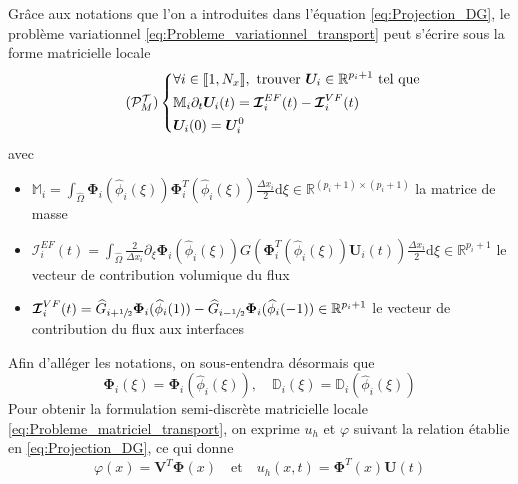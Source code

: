 \documentclass[11pt, a4paper, oneside]{report}
\begin{document}
\begin{appendices}
Grâce aux notations que l'on a introduites dans l'équation \eqref{eq:Projection_DG}, le problème variationnel \eqref{eq:Probleme_variationnel_transport} peut s'écrire sous la forme matricielle locale
\begin{equation} \tag{$\mathcal{P}_M^\mathcal{T}$} \label{eq:Probleme_matriciel_transport}
    \left \{
    \begin{aligned}
        & \forall i \in \llbracket 1, N_x \rrbracket, \text{ trouver } \bm{U}_{i} \in \mathbb{R}^{p_i + 1} \text{ tel que} \\
        &\mathbb{M}_i \partial_t \bm{U}_i(t) = \bm{\mathcal{I}}_i^{EF}(t) - \bm{\mathcal{I}}_i^{VF}(t) \\
        &\bm{U}_i(0) = \bm{U}_i^0
    \end{aligned}
    \right .
\end{equation}
avec
\begin{itemize}
    \item $\displaystyle \mathbb{M}_i = \int_{\widehat{\Omega}} \bm{\Phi}_i (\widehat{\phi}_i(\xi)) \bm{\Phi}_i^T(\widehat{\phi}_i(\xi)) \frac{\Delta x_i}{2} \text{d}\xi \in \mathbb{R}^{(p_i+1) \times (p_i+1)}$ la matrice de masse
    \item $\displaystyle \bm{\mathcal{I}}_i^{EF}(t) = \int_{\widehat{\Omega}} \frac{2}{\Delta x_i} \partial_\xi \bm{\Phi}_i(\widehat{\phi}_i(\xi)) G \left( \bm{\Phi}_i^T(\widehat{\phi}_i(\xi)) \bm{U}_i(t) \right) \frac{\Delta x_i}{2} \text{d}\xi \in \mathbb{R}^{p_i+1}$ le vecteur de contribution volumique du flux
    \item $\displaystyle \bm{\mathcal{I}}_i^{VF}(t) = \widehat{G}_{i + \sfrac{1}{2}} \bm{\Phi}_i(\widehat{\phi}_i(1)) - \widehat{G}_{i-\sfrac{1}{2}} \bm{\Phi}_i(\widehat{\phi}_i(-1)) \in \mathbb{R}^{p_i+1}$ le vecteur de contribution du flux aux interfaces
\end{itemize}
Afin d'alléger les notations, on sous-entendra désormais que
\begin{equation}
    \bm{\Phi}_i(\xi) = \bm{\Phi}_i(\widehat{\phi}_i(\xi)), \quad \mathbb{D}_i(\xi) = \mathbb{D}_i(\widehat{\phi}_i(\xi))
\end{equation}
Pour obtenir la formulation semi-discrète matricielle locale \eqref{eq:Probleme_matriciel_transport}, on exprime $u_h$ et $\varphi$ suivant la relation établie en \eqref{eq:Projection_DG}, ce qui donne
\begin{equation}
    \varphi(x) = \bm{V}^T \bm{\Phi}(x) \quad \text{et} \quad u_h(x, t) = \bm{\Phi}^T(x) \bm{U}(t)
\end{equation}

\end{appendices}
\end{document}
